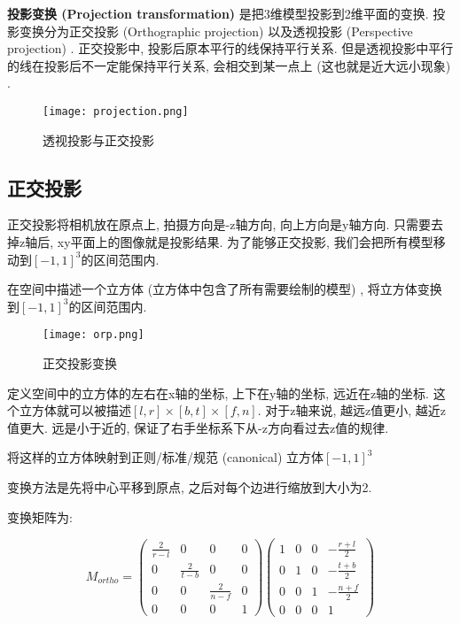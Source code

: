 \documentclass[openany]{progbookcn}
\begin{document}
\textbf{投影变换 (Projection transformation) }是把3维模型投影到2维平面的变换. 投影变换分为正交投影 (Orthographic projection) 以及透视投影 (Perspective projection) . 正交投影中, 投影后原本平行的线保持平行关系. 但是透视投影中平行的线在投影后不一定能保持平行关系, 会相交到某一点上 (这也就是近大远小现象) . 

\begin{figure}[H]
	\centering
	\texttt{[image: projection.png]}
	\caption{透视投影与正交投影}
	\label{fig:projection}
\end{figure}

\subsection{正交投影}

正交投影将相机放在原点上, 拍摄方向是-z轴方向, 向上方向是y轴方向. 只需要去掉z轴后, xy平面上的图像就是投影结果. 为了能够正交投影, 我们会把所有模型移动到$[-1,1]^3$的区间范围内. 

在空间中描述一个立方体 (立方体中包含了所有需要绘制的模型) , 将立方体变换到$[-1,1]^3$的区间范围内. 

\begin{figure}[H]
	\centering
	\texttt{[image: orp.png]}
	\caption{正交投影变换}
	\label{fig:projection}
\end{figure}

定义空间中的立方体的左右在x轴的坐标, 上下在y轴的坐标, 远近在z轴的坐标. 这个立方体就可以被描述$[l,r]\times[b,t]\times[f,n]$. 对于z轴来说, 越远z值更小, 越近z值更大. 远是小于近的, 保证了右手坐标系下从-z方向看过去z值的规律. 

将这样的立方体映射到正则/标准/规范 (canonical) 立方体$[-1,1]^3$

变换方法是先将中心平移到原点, 之后对每个边进行缩放到大小为2. 

变换矩阵为: 

\begin{equation}
	M_{ortho}=\begin{pmatrix}\frac{2}{r-l}&0&0&0\\0&\frac{2}{t-b}&0&0\\0&0&\frac{2}{n-f}&0\\0&0&0&1\end{pmatrix}\begin{pmatrix}1&0&0&-\frac{r+l}{2}\\0&1&0&-\frac{t+b}{2}\\0&0&1&-\frac{n+f}{2}\\0&0&0&1\end{pmatrix}
\end{equation}
\end{document}
